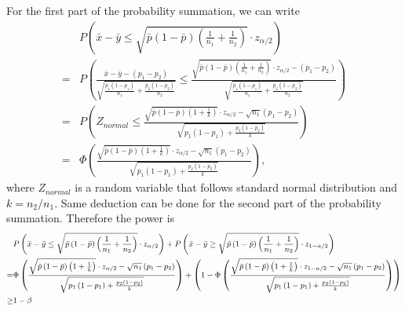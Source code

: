 \documentclass[a4paper,12pt]{article}
\begin{document}
For the first part of the probability summation, we can write
\[
  \begin{aligned}
    & P\left(
      \bar{x} - \bar{y}
      \leq
      \sqrt{\bar{p}\left(1 - \bar{p}\right)\left(\frac{1}{n_1} + \frac{1}{n_2}\right)}
      \cdot z_{\alpha / 2}
    \right)    \\
    = & P\left(
      \frac{\bar{x} - \bar{y} - \left(p_1 - p_2\right)}{
        \sqrt{
          \frac{p_1\left(1 - p_1\right)}{n_1}
          + \frac{p_2\left(1 - p_2\right)}{n_2}
        }
      }
      \leq \frac{
        \sqrt{\bar{p}\left(1 - \bar{p}\right)\left(\frac{1}{n_1} + \frac{1}{n_2}\right)}
        \cdot z_{\alpha / 2}
        -\left(p_1 - p_2\right)
      }{
        \sqrt{
          \frac{p_1\left(1 - p_1\right)}{n_1}
          + \frac{p_2\left(1 - p_2\right)}{n_2}
        }
      }
    \right)    \\
    =& P\left(
      Z_{normal} \leq \frac{
        \sqrt{\bar{p}\left(1 - \bar{p}\right)\left(1 + \frac{1}{k}\right)}
        \cdot z_{\alpha / 2}
        -\sqrt{n_1}\left(p_1 - p_2\right)
      }{
        \sqrt{
          p_1\left(1 - p_1\right)
          + \frac{p_2\left(1 - p_2\right)}{k}
        }
      }
    \right)   \\
    =& \Phi\left(
      \frac{
        \sqrt{\bar{p}\left(1 - \bar{p}\right)\left(1 + \frac{1}{k}\right)}
        \cdot z_{\alpha / 2}
        -\sqrt{n_1}\left(p_1 - p_2\right)
      }{
        \sqrt{
          p_1\left(1 - p_1\right)
          + \frac{p_2\left(1 - p_2\right)}{k}
        }
      }
    \right)
    ,
  \end{aligned}
\]
where $Z_{normal}$ is a random variable that follows standard normal distribution and $k = n_2 / n_1$. Same deduction can be done for the second part of the probability summation. Therefore the power is
\[\small
  \begin{aligned}
& P\left(
      \bar{x} - \bar{y}
      \leq
      \sqrt{\bar{p}\left(1 - \bar{p}\right)\left(\frac{1}{n_1} + \frac{1}{n_2}\right)}
      \cdot z_{\alpha / 2}
    \right)
    + P\left(
      \bar{x} - \bar{y}
      \geq
      \sqrt{\bar{p}\left(1 - \bar{p}\right)\left(\frac{1}{n_1} + \frac{1}{n_2}\right)}
      \cdot z_{1 - \alpha / 2}
    \right)    \\
    =& \Phi\left(
      \frac{
        \sqrt{\bar{p}\left(1 - \bar{p}\right)\left(1 + \frac{1}{k}\right)}
        \cdot z_{\alpha / 2}
        -\sqrt{n_1}\left(p_1 - p_2\right)
      }{
        \sqrt{
          p_1\left(1 - p_1\right)
          + \frac{p_2\left(1 - p_2\right)}{k}
        }
      }
    \right)
    + \left(
      1 -
      \Phi\left(
      \frac{
        \sqrt{\bar{p}\left(1 - \bar{p}\right)\left(1 + \frac{1}{k}\right)}
        \cdot z_{1 - \alpha / 2}
        -\sqrt{n_1}\left(p_1 - p_2\right)
      }{
        \sqrt{
          p_1\left(1 - p_1\right)
          + \frac{p_2\left(1 - p_2\right)}{k}
        }
      }
    \right)
  \right)    \\
  \geq& 1 - \beta
  \end{aligned}
\]
\end{document}
